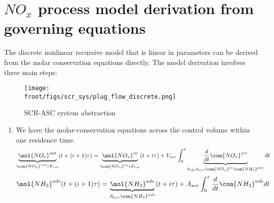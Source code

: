 \newpage
\section{$NO_x$ process model derivation from governing equations}
The discrete nonlinear recursive model that is linear in parameters can be derived from the molar conservation equations directly. The model derivation involves three main steps:
\begin{figure}[H]
        \centering
        \texttt{[image: \\froot/figs/scr\_sys/plug\_flow\_discrete.png]}
        \caption{SCR-ASC system abstraction}
\end{figure}
\begin{enumerate}
        \item We have the molar-conservation equations across the control volume within one residence time.
                \begin{multline}
                        \underbrace{\mol{NO_x}^{out} }_{ \con{NO_x}^{out} \tau F_{vol} } (t + (i+1) \tau) =
                                \underbrace{\mol{NO_x}^{in} }_{ \con{NO_x}^{in} \tau F_{vol} } (t + i \tau)
                                + V_{scr} \int_0^{\tau}
                                                \underbrace{\frac{d}{dt} \con{NO_x}^{scr}}_
                                                        {k_{s2v} k_{scr} \con{NO_x}^{in} \con{NH_3}^{ads}}
                                           dt
                        \label{eqn::nox_bal}
                \end{multline}
                \begin{multline}
                       \mol{NH_3}^{ads} (t + (i+1) \tau) =
                                \underbrace{\mol{NH_3}^{ads} }_{A_{scr} \con{NH_3}^{ads}} (t + i \tau)
                                + A_{scr} \int_0^{\tau}
                                               \frac{d}{dt} \con{NH_3}^{ads}
                                                dt

\end{multline}
\end{enumerate}
